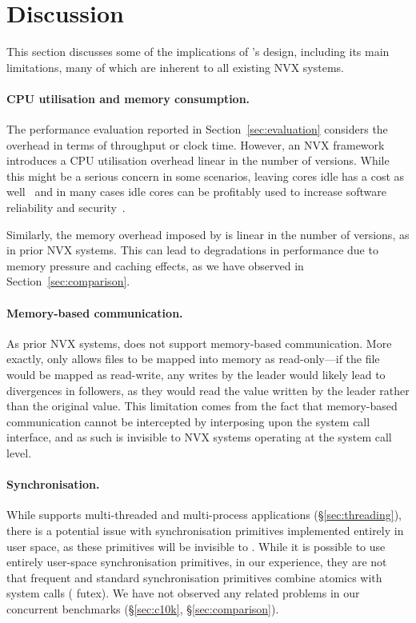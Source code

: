 \section{Discussion}
\label{sec:discussion}

This section discusses some of the implications of \varan's design,
including its main limitations, many of which are inherent to all
existing NVX systems.

\paragraph{CPU utilisation and memory consumption.} The performance
evaluation reported in Section~\ref{sec:evaluation} considers the
overhead in terms of throughput or clock time.  However, an NVX
framework introduces a CPU utilisation overhead linear in the number
of versions.  While this might be a serious concern in some scenarios,
leaving cores idle has a cost as well~\cite{barroso2007} and in many
cases idle cores can be profitably used to increase software reliability
and security~\cite{cox2006,multiplicity,orchestra09,diehard06,mvupdates12}.

Similarly, the memory overhead imposed by \varan is linear in the
number of versions, as in prior NVX systems.  This can lead to
degradations in performance due to memory pressure and caching
effects, as we have observed in Section~\ref{sec:comparison}.


\paragraph{Memory-based communication.} As prior NVX systems, \varan
does not support memory-based communication.  More exactly, \varan
only allows files to be mapped into memory as read-only---if the file
would be mapped as read-write, any writes by the leader would likely
lead to divergences in followers, as they would read the value written
by the leader rather than the original value.  This limitation comes
from the fact that memory-based communication cannot be intercepted by
interposing upon the system call interface, and as such is invisible
to NVX systems operating at the system call level.


\paragraph{Synchronisation.} While \varan supports multi-threaded and
multi-process applications (\S\ref{sec:threading}), there is a
potential issue with synchronisation primitives implemented entirely
in user space, as these primitives will be invisible to \varan. While
it is possible to use entirely user-space synchronisation primitives,
in our experience, they are not that frequent and standard
synchronisation primitives combine atomics with system calls (\ie
futex). We have not observed any related problems in our concurrent
benchmarks (\S\ref{sec:c10k}, \S\ref{sec:comparison}).

